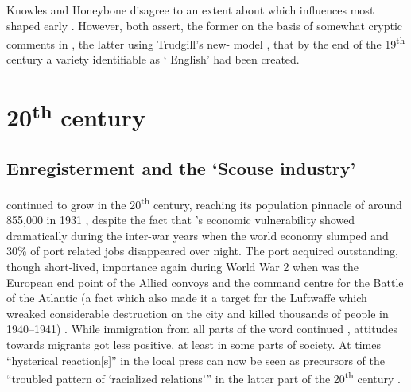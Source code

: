 Knowles and Honeybone disagree to an extent about which influences most shaped early .
However, both assert, the former on the basis of somewhat cryptic comments in \citealt{ellis1889} \citep[cf.][18]{knowles1973}, the latter using Trudgill's new- model \citep[cf.][118]{honeybone2007}, that by the end of the 19\textsuperscript{th} century a variety identifiable as ` English' had been created.

	\section{20\textsuperscript{th} century}\label{sec.hist.20}

		\subsection{Enregisterment and the `Scouse industry'}\label{sec.hist.20.industry}

 continued to grow in the 20\textsuperscript{th} century, reaching its population pinnacle of around 855,000 in 1931 \citep[cf.][171]{pooley2006}, despite the fact that 's economic vulnerability showed dramatically during the inter-war years when the world economy slumped and 30\% of port related jobs disappeared over night.
The port acquired outstanding, though short-lived, importance again during World War 2 when  was the European end point of the Allied convoys and the command centre for the Battle of the Atlantic (a fact which also made it a  target for the Luftwaffe which wreaked considerable destruction on the city and killed thousands of people in 1940--1941) \citep[cf.][393 and 405]{murden2006}.
While immigration from all parts of the word continued \citep[cf.][119]{honeybone2007}, attitudes towards migrants got less positive, at least in some parts of  society.
At times ``hysterical reaction[s]'' in the local press can now be seen as precursors of the ``troubled pattern of `racialized relations''' in the latter part of the 20\textsuperscript{th} century \citep[cf.][23]{belchem2006a}.

